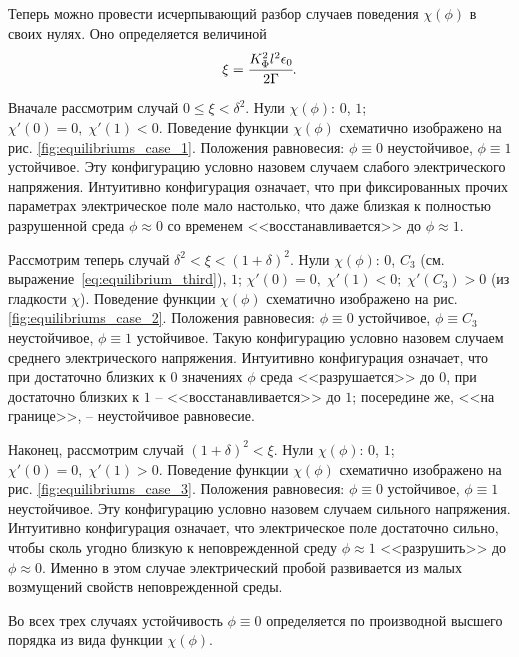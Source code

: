 Теперь можно провести исчерпывающий разбор случаев поведения $\chi(\phi)$ в своих нулях. Оно определяется величиной
\begin{equation}
	\xi = \cfrac{K_\Phi^2 l^2 \epsilon_0}{2 \Gamma} {\text{.}}
	\label{char:equilibriums}
\end{equation}

Вначале рассмотрим случай $0 \leqslant \xi < \delta^2$. Нули $\chi(\phi)$: $0$, $1$; $\chi'(0) = 0, \; \chi'(1) < 0$. Поведение функции $\chi(\phi)$ схематично изображено на рис. \ref{fig:equilibriums_case_1}. Положения равновесия: $\phi \equiv 0$ неустойчивое, $\phi \equiv 1$ устойчивое. Эту конфигурацию условно назовем случаем слабого электрического напряжения. Интуитивно конфигурация означает, что при фиксированных прочих параметрах электрическое поле мало настолько, что даже близкая к полностью разрушенной среда $\phi \approx 0$ со временем <<восстанавливается>> до $\phi \approx 1$.

Рассмотрим теперь случай $\delta^2 < \xi < (1 + \delta)^2$. Нули $\chi(\phi)$: $0$, $C_3$ (см. выражение~\eqref{eq:equilibrium_third}), $1$; $\chi'(0) = 0, \; \chi'(1) < 0; \; \chi'(C_3) > 0$ (из гладкости $\chi$). Поведение функции $\chi(\phi)$ схематично изображено на рис. \ref{fig:equilibriums_case_2}. Положения равновесия: $\phi \equiv 0$ устойчивое, $\phi \equiv C_3$ неустойчивое, $\phi \equiv 1$ устойчивое. Такую конфигурацию условно назовем случаем среднего электрического напряжения. Интуитивно конфигурация означает, что при достаточно близких к $0$ значениях $\phi$ среда <<разрушается>> до $0$, при достаточно близких к $1$ -- <<восстанавливается>> до $1$; посередине же, <<на границе>>, -- неустойчивое равновесие.

Наконец, рассмотрим случай $(1 + \delta)^2 < \xi$. Нули $\chi(\phi)$: $0$, $1$; $\chi'(0) = 0, \; \chi'(1) > 0$. Поведение функции $\chi(\phi)$ схематично изображено на рис. \ref{fig:equilibriums_case_3}. Положения равновесия: $\phi \equiv 0$ устойчивое, $\phi \equiv 1$ неустойчивое. Эту конфигурацию условно назовем случаем сильного напряжения. Интуитивно конфигурация означает, что электрическое поле достаточно сильно, чтобы сколь угодно близкую к неповрежденной среду $\phi \approx 1$ <<разрушить>> до $\phi \approx 0$. Именно в этом случае электрический пробой развивается из малых возмущений свойств неповрежденной среды.

Во всех трех случаях устойчивость $\phi \equiv 0$ определяется по производной высшего порядка из вида функции $\chi(\phi)$.


